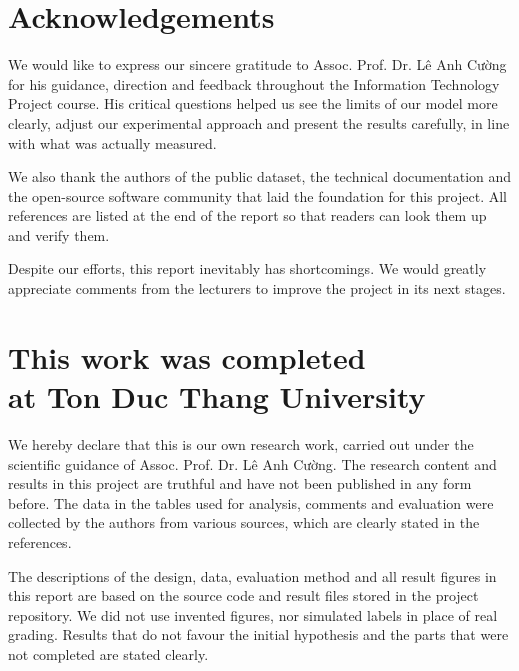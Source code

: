 \documentclass[12pt,a4paper,oneside]{report}
\begin{document}
\DeclareRobustCommand{\xuongdong}{\\}
\DeclareRobustCommand{\canhtieude}{\\[10pt]}

\chapter*{Acknowledgements}

We would like to express our sincere gratitude to Assoc. Prof. Dr. Lê Anh Cường for his guidance, direction and feedback throughout the Information Technology Project course. His critical questions helped us see the limits of our model more clearly, adjust our experimental approach and present the results carefully, in line with what was actually measured.

We also thank the authors of the public dataset, the technical documentation and the open-source software community that laid the foundation for this project. All references are listed at the end of the report so that readers can look them up and verify them.

Despite our efforts, this report inevitably has shortcomings. We would greatly appreciate comments from the lecturers to improve the project in its next stages.

\kyten

\chapter*{This work was completed\xuongdong{}at Ton Duc Thang University}

We hereby declare that this is our own research work, carried out under the scientific guidance of Assoc. Prof. Dr. Lê Anh Cường. The research content and results in this project are truthful and have not been published in any form before. The data in the tables used for analysis, comments and evaluation were collected by the authors from various sources, which are clearly stated in the references.

The descriptions of the design, data, evaluation method and all result figures in this report are based on the source code and result files stored in the project repository. We did not use invented figures, nor simulated labels in place of real grading. Results that do not favour the initial hypothesis and the parts that were not completed are stated clearly.
\end{document}
